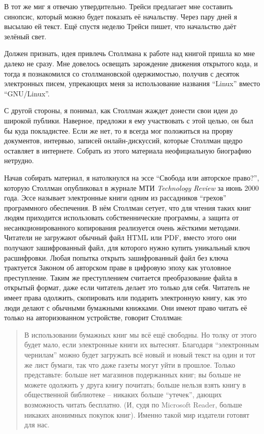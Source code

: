 В тот же миг я отвечаю утвердительно. Трейси предлагает мне составить синопсис, который можно будет показать её начальству. Через пару дней я высылаю ей текст. Ещё спустя неделю Трейси пишет, что начальство даёт зелёный свет.

Должен признать, идея привлечь Столлмана к работе над книгой пришла ко мне далеко не сразу. Мне довелось освещать зарождение движения открытого кода, и тогда я познакомился со столлмановской одержимостью, получив с десяток электронных писем, упрекающих меня за использование названия ``Linux'' вместо ``GNU/Linux''.

С другой стороны, я понимал, как Столлман жаждет донести свои идеи до широкой публики. Наверное, предложи я ему участвовать с этой целью, он был бы куда покладистее. Если же нет, то я всегда мог положиться на прорву документов, интервью, записей онлайн-дискуссий, которые Столлман щедро оставляет в интернете. Собрать из этого материала неофициальную биографию нетрудно.

Начав собирать материал, я натолкнулся на эссе ``Свобода или авторское право?'', которую Столлман опубликовал в журнале МТИ \textit{Technology Review} за июнь 2000 года. Эссе называет электронные книги одним из рассадников ``грехов'' программного обеспечения. В нём Столлман сетует, что для чтения таких книг людям приходится использовать собственнические программы, а защита от несанкционированного копирования реализуется очень жёсткими методами. Читатели не загружают обычный файл HTML или PDF, вместо этого они получают зашифрованный файл, для которого нужно купить уникальный ключ расшифровки. Любая попытка открыть зашифрованный файл без ключа трактуется Законом об авторском праве в цифровую эпоху как уголовное преступление. Таким же преступлением считается преобразование файла в открытый формат, даже если читатель делает это только для себя. Читатель не имеет права одолжить, скопировать или подарить электронную книгу, как это люди делают с обычными бумажными книжками. Они имеют право читать её только на авторизованном устройстве, говорит Столлман:

\begin{quote}
В использовании бумажных книг мы всё ещё свободны. Но толку от этого будет мало, если электронные книги их вытеснят. Благодаря ``электронным чернилам'' можно будет загружать всё новый и новый текст на один и тот же лист бумаги, так что даже газеты могут уйти в прошлое. Только представьте: больше нет магазинов подержанных книг; вы больше не можете одолжить у друга книгу почитать; больше нельзя взять книгу в общественной библиотеке -- никаких больше ``утечек'', дающих возможность читать бесплатно. (И, судя по Microsoft Reader, больше никаких анонимных покупок книг). Именно такой мир издатели готовят для нас. 
\end{quote}

